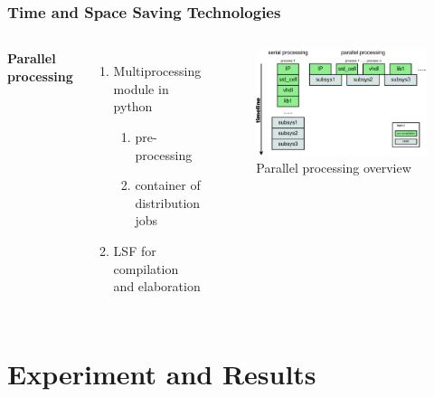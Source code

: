 \documentclass{beamer}
\begin{document}
\begin{frame}
  \frametitle{Time and Space Saving Technologies}
  \begin{columns}[c] %

    \textbf{Parallel processing}
    \begin{enumerate}
    \item Multiprocessing module in python
      \begin{enumerate}
      \item pre-processing
      \item container of distribution jobs
      \end{enumerate}
    \item LSF for compilation and elaboration
    \end{enumerate}

    \begin{figure}
      \centering
      \includegraphics[width=0.9\linewidth]{parallel}
      \caption{Parallel processing overview}
    \end{figure}

  \end{columns}
\end{frame}

\section{Experiment and Results}
\end{document}
